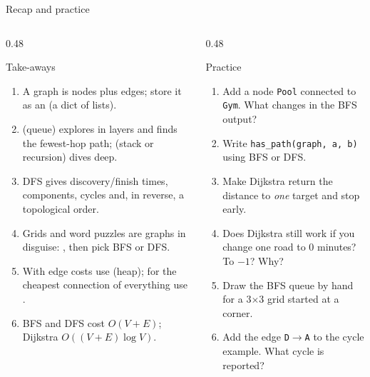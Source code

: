 \documentclass[aspectratio=169,10pt]{beamer}
\begin{document}
\begin{frame}{Recap and practice}
\begin{columns}[T]
\begin{column}{0.48\textwidth}
\begin{block}{Take-aways}
{\footnotesize
\begin{enumerate}\setlength\itemsep{2pt}
\item A graph is nodes plus edges; store it as an  (a dict of lists).
\item {} (queue) explores in layers and finds the fewest-hop path;  (stack or recursion) dives deep.
\item DFS gives discovery/finish times, components, cycles and, in reverse, a topological order.
\item Grids and word puzzles are graphs in disguise: , then pick BFS or DFS.
\item With edge costs use  (heap); for the cheapest connection of everything use .
\item BFS and DFS cost $O(V+E)$; Dijkstra $O((V+E)\log V)$.
\end{enumerate}}
\end{block}
\end{column}
\begin{column}{0.48\textwidth}
\begin{block}{Practice}
{\footnotesize
\begin{enumerate}\setlength\itemsep{2pt}
\item Add a node \texttt{Pool} connected to \texttt{Gym}. What changes in the BFS output?
\item Write \texttt{has\_path(graph, a, b)} using BFS or DFS.
\item Make Dijkstra return the distance to \emph{one} target and stop early.
\item Does Dijkstra still work if you change one road to 0 minutes? To $-1$? Why?
\item Draw the BFS queue by hand for a 3$\times$3 grid started at a corner.
\item Add the edge \texttt{D}$\to$\texttt{A} to the cycle example. What cycle is reported?
\end{enumerate}}
\end{block}
\end{column}
\end{columns}
\end{frame}
\end{document}
